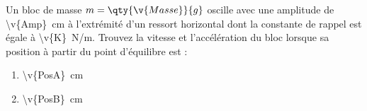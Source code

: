Un bloc de masse $m = \qty{\v{Masse}}{g}$ oscille avec une amplitude de \qty{\v{Amp}}{cm} à l’extrémité d’un ressort horizontal dont la constante de rappel est égale à \qty{\v{K}}{N/m}. Trouvez la vitesse et l’accélération du bloc lorsque sa position à partir du point d’équilibre est :

\begin{enumerate}[label=\alph*)]
    \item \qty{\v{PosA}}{cm}
    \item \qty{\v{PosB}}{cm}
\end{enumerate}